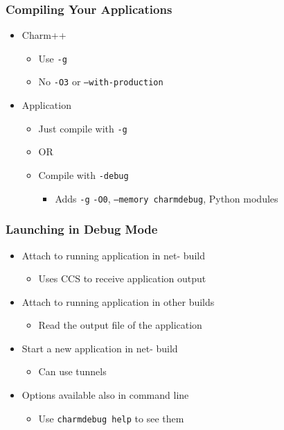 \begin{frame}[fragile]
  \frametitle{Compiling Your Applications}
  \begin{itemize}
    \item Charm++
      \begin{itemize}
      \item Use \texttt{-g}
      \item No \texttt{­-O3} or \texttt{--with-production}
      \end{itemize}
    \item Application
      \begin{itemize}
      \item Just compile with \texttt{-g}
      \item OR
      \item Compile with \texttt{-debug}
        \begin{itemize}
        \item Adds \texttt{­-g} \texttt{-­O0}, \texttt{--memory charmdebug}, Python
          modules
        \end{itemize}
      \end{itemize}
  \end{itemize}
\end{frame}

\begin{frame}[fragile]
  \frametitle{Launching in Debug Mode}
  \begin{itemize}
    \item Attach to running application in net- build
      \begin{itemize}
      \item Uses CCS to receive application output
      \end{itemize}
    \item Attach to running application in other builds
      \begin{itemize}
      \item Read the output file of the application
      \end{itemize}
    \item Start a new application in net- build
      \begin{itemize}
      \item Can use tunnels
      \end{itemize}
    \item Options available also in command line
      \begin{itemize}
      \item Use \verb|charmdebug ­help| to see them
      \end{itemize}
  \end{itemize}
\end{frame}
